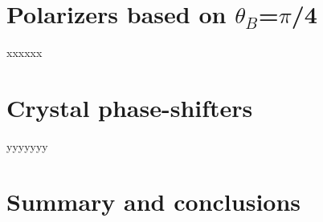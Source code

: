 \documentclass{iucr}
\begin{document}


\section{Polarizers based on $\theta_B$=$\pi$/4}\label{sec:polarizers45deg}

xxxxxx

\section{Crystal phase-shifters}\label{sec:phasesifters}

yyyyyyy


\section{Summary and conclusions}
\label{sec:summary}
\end{document}
